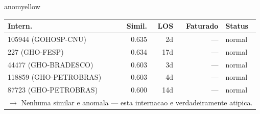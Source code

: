\documentclass[a4paper,10pt]{article}
\begin{document}
\begin{anomalycard}[Internacao 164361 | GHO-PETROBRAS | MODERADO (z=2.34)]{anomyellow}
\begin{tabular}{l r r r l}\toprule\textbf{Intern.} & \textbf{Simil.} & \textbf{LOS} & \textbf{Faturado} & \textbf{Status} \\\midrule
105944 (GOHOSP-CNU) & 0.635 & 2d & --- & \textcolor{jcubeblue}{normal} \\
227 (GHO-FESP) & 0.634 & 17d & --- & \textcolor{jcubeblue}{normal} \\
44477 (GHO-BRADESCO) & 0.603 & 3d & --- & \textcolor{jcubeblue}{normal} \\
118859 (GHO-PETROBRAS) & 0.603 & 4d & --- & \textcolor{jcubeblue}{normal} \\
87723 (GHO-PETROBRAS) & 0.600 & 14d & --- & \textcolor{jcubeblue}{normal} \\
\multicolumn{5}{l}{\textcolor{jcubeblue}{\small $\rightarrow$ Nenhuma similar e anomala --- esta internacao e verdadeiramente atipica.}} \\
\bottomrule\end{tabular}


\end{anomalycard}

\newpage
\end{document}

